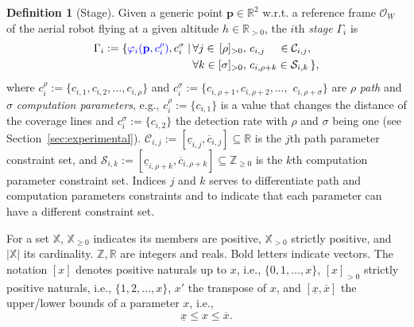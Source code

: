 \documentclass[letterpaper,10pt,journal,twoside]{IEEEtran}
\theoremstyle{definition}
\newtheorem{defn}{Definition}[section]
\begin{document}

\begin{defn}[Stage]\label{def:stage}
  Given a generic point $\mathbf{p}\in\mathbb{R}^2$ w.r.t. a reference frame $\mathcal{O}_W$ of the aerial robot flying at a given altitude $h\in\mathbb{R}_{>0}$, the $i$th \emph{stage} $\Gamma_i$ %
  is
  \begin{equation*}\begin{split}
    \Gamma_i:=\{{\color{blue}\varphi_i(\mathbf{p}%
    ,c_i^\rho)},c_i^\sigma\mid
    \,&\forall j\in\,[\rho]_{>0},\,c_{i,j}\,\,\,\,\,\,\,\in\mathcal{C}_{i,j},\,\\
      &\forall k\in[\sigma]_{>0},\,c_{i,\rho+k}\in\mathcal{S}_{i,k}\,\},
  \end{split}\end{equation*}
  where $c_i^\rho${\color{blue}$:=\{c_{i,1},c_{i,2},\dots,c_{i,\rho}\}$} and $c_i^\sigma${\color{blue}$:=\{c_{i,\rho+1},c_{i,\rho+2},\dots,$ $c_{i,\rho+\sigma}\}$} are $\rho$ \emph{path} and $\sigma$ \emph{computation parameters}{\color{blue}, e.g., $c_i^\rho:=\{c_{i,1}\}$ is a value that changes the distance of the coverage lines and $c^\sigma_i:=\{c_{i,2}\}$ the detection rate with $\rho$ and $\sigma$ being one (see Section~\ref{sec:experimental})}. $\mathcal{C}_{i,j}:=[\underline{c}_{i,j},\overline{c}_{i,j}]\subseteq\mathbb{R}$ is the $j$th path parameter %
  constraint set, and $\mathcal{S}_{i,k}:=[\underline{c}_{i,\rho+k},\overline{c}_{i,\rho+k}]\subseteq\mathbb{Z}_{\geq 0}$ is the $k$th computation parameter constraint set. {\color{blue}Indices $j$ and $k$ serves to differentiate path and computation parameters constraints and to indicate that each parameter can have a different constraint set.} 
\end{defn}


For a set $\mathbb{X}$, $\mathbb{X}_{\geq 0}$ indicates its members are positive, $\mathbb{X}_{> 0}$ strictly positive, and $|\mathbb{X}|$ its cardinality. $\mathbb{Z},\mathbb{R}$ are %
integers and reals. %
Bold letters indicate vectors. 
The notation $[x]$ denotes positive naturals up to $x$, i.e., $\{0,1,\dots,x\}$, {\color{blue}$[x]_{>0}$ strictly positive naturals, i.e., $\{1,2,\dots,x\}$,} $x'$ the transpose of $x$, and $[\underline{x},\overline{x}]$ the upper/lower bounds of a parameter $x$, i.e.,
\begin{equation}
  \underline{x}\leq x\leq\overline{x}.
\end{equation}
\end{document}

